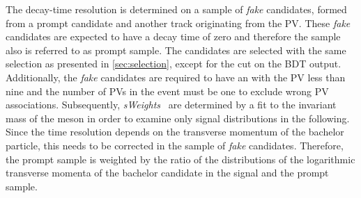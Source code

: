 The decay-time resolution is determined on a sample of \emph{fake} \Bz candidates, formed from a prompt \Dpm candidate and another track originating from the PV.
These \emph{fake} \Bz candidates are expected to have a decay time of zero and therefore the sample also is referred to as prompt sample.
The candidates are selected with the same selection as presented in \cref{sec:selection}, except for the cut on the BDT output.
Additionally, the \emph{fake} \Bz candidates are required to have an \chisqip with the PV less than nine and the number of \ac{PV}s in the event must be one to exclude wrong \ac{PV} associations.
Subsequently, \emph{sWeights}~\cite{Pivk:2004ty} are determined by a fit to the invariant mass of the \Dpm meson in order to examine only signal distributions in the following.
Since the time resolution depends on the transverse momentum of the bachelor particle, this needs to be corrected in the sample of \emph{fake} \Bz candidates.
Therefore, the prompt sample is weighted by the ratio of the distributions of the logarithmic transverse momenta of the bachelor candidate in the signal \BdToDpi and the prompt sample.


